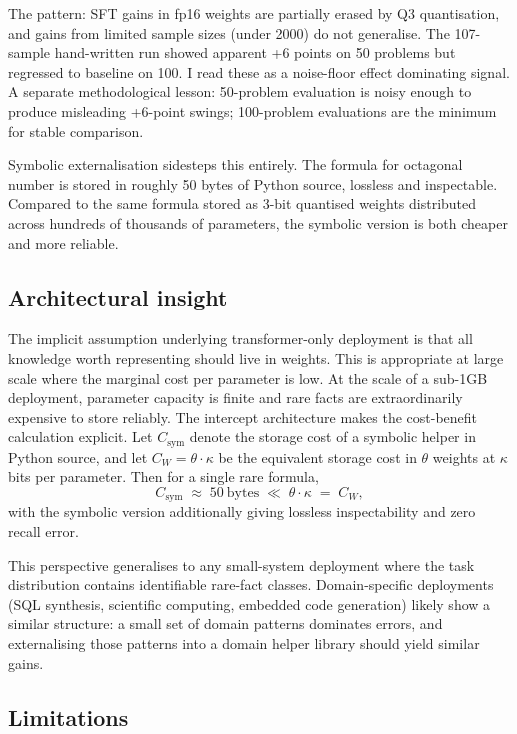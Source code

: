 \documentclass[11pt,a4paper]{article}
\begin{document}
The pattern: SFT gains in fp16 weights are partially erased by Q3 quantisation, and gains from limited sample sizes (under 2000) do not generalise. The 107-sample hand-written run showed apparent +6 points on 50 problems but regressed to baseline on 100. I read these as a noise-floor effect dominating signal. A separate methodological lesson: 50-problem evaluation is noisy enough to produce misleading +6-point swings; 100-problem evaluations are the minimum for stable comparison.

Symbolic externalisation sidesteps this entirely. The formula for octagonal number is stored in roughly 50 bytes of Python source, lossless and inspectable. Compared to the same formula stored as 3-bit quantised weights distributed across hundreds of thousands of parameters, the symbolic version is both cheaper and more reliable.

\subsection{Architectural insight}

The implicit assumption underlying transformer-only deployment is that all knowledge worth representing should live in weights. This is appropriate at large scale where the marginal cost per parameter is low. At the scale of a sub-1GB deployment, parameter capacity is finite and rare facts are extraordinarily expensive to store reliably. The intercept architecture makes the cost-benefit calculation explicit. Let $C_{\text{sym}}$ denote the storage cost of a symbolic helper in Python source, and let $C_W = \theta \cdot \kappa$ be the equivalent storage cost in $\theta$ weights at $\kappa$ bits per parameter. Then for a single rare formula,
\begin{equation}
C_{\text{sym}} \;\approx\; 50\ \text{bytes} \;\ll\; \theta \cdot \kappa \;=\; C_W,
\label{eq:cost}
\end{equation}
with the symbolic version additionally giving lossless inspectability and zero recall error.

This perspective generalises to any small-system deployment where the task distribution contains identifiable rare-fact classes. Domain-specific deployments (SQL synthesis, scientific computing, embedded code generation) likely show a similar structure: a small set of domain patterns dominates errors, and externalising those patterns into a domain helper library should yield similar gains.

\subsection{Limitations}
\end{document}
